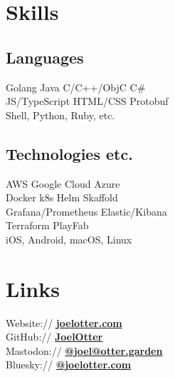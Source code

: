\documentclass[]{deedy-resume-openfont}
\begin{document}
%
%



%
%

\begin{minipage}[t]{0.33\textwidth} 


\section{Skills}
\subsection{Languages}
Golang \textbullet{}   Java \textbullet{} C/C++/ObjC \textbullet{} C\# \\
JS/TypeScript \textbullet{} HTML/CSS \textbullet{} Protobuf \\
Shell, Python, Ruby, etc.
\sectionsep
\subsection{Technologies etc.}
AWS \textbullet{} Google Cloud \textbullet{} Azure \\
Docker \textbullet{} k8s \textbullet{} Helm \textbullet{} Skaffold \\
Grafana/Prometheus \textbullet{} Elastic/Kibana \\
Terraform \textbullet{} PlayFab \\
iOS, Android, macOS, Linux \\
\sectionsep


\section{Links} 
Website:// \href{https://www.joelotter.com}{\bf{joelotter.com}} \\
GitHub:// \href{http://github.com/JoelOtter}{\bf{JoelOtter}} \\
Mastodon://  \href{https://otter.garden/@joel}{\bf{@joel@otter.garden}} \\
Bluesky://  \href{https://bsky.app/joelotter.com}{\bf{@joelotter.com}} \\
\sectionsep


\end{minipage}
\end{document}
